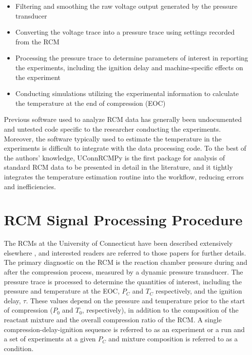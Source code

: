 \documentclass[12pt]{../ussci}
\begin{document}
\begin{itemize}
\item
  Filtering and smoothing the raw voltage output generated by the pressure
  transducer
\item
  Converting the voltage trace into a pressure trace using settings
  recorded from the RCM
\item
  Processing the pressure trace to determine parameters of interest in
  reporting the experiments, including the ignition delay and
  machine-specific effects on the experiment
\item
  Conducting simulations utilizing the experimental information to
  calculate the temperature at the end of compression (EOC)
\end{itemize}

Previous software used to analyze RCM data has generally been
undocumented and untested code specific to the researcher conducting the
experiments. Moreover, the software typically used to estimate the
temperature in the experiments is difficult to integrate with the data
processing code. To the best of the authors' knowledge, UConnRCMPy is
the first package for analysis of standard RCM data to be presented in
detail in the literature, and it tightly integrates the temperature
estimation routine into the workflow, reducing errors and
inefficiencies.

\section{RCM Signal Processing Procedure}\label{rcm-signal-processing-procedure}

The RCMs at the University of Connecticut have been described extensively
elsewhere \autocite{Das2012,Mittal2007a}, and interested readers are referred to
those papers for further details. The primary diagnostic on the RCM is the
reaction chamber pressure during and after the compression process, measured by
a dynamic pressure transducer. The pressure trace is processed to determine the
quantities of interest, including the pressure and temperature at the EOC,
\(P_C\) and \(T_C\) respectively, and the ignition delay, \(\tau\). These values
depend on the pressure and temperature prior to the start of compression
(\(P_0\) and \(T_0\), respectively), in addition to the composition of the
reactant mixture and the overall compression ratio of the RCM. A single
compression-delay-ignition sequence is referred to as an experiment or a run and
a set of experiments at a given \(P_C\) and mixture composition is referred to
as a condition.
\end{document}
